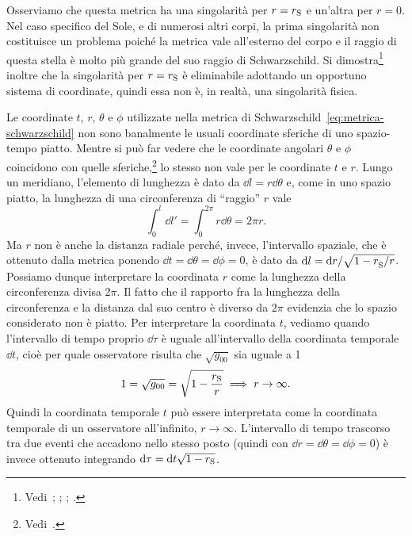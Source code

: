 Osserviamo che questa metrica ha una singolarità per $r = r_{\textup{S}}$ e
un'altra per $r = 0$.  Nel caso specifico del Sole, e di numerosi altri corpi,
la prima singolarità non costituisce un problema poiché la metrica vale
all'esterno del corpo e il raggio di questa stella è molto più grande del suo
raggio di Schwarzschild.  Si
dimostra\footnote{Vedi~\textcite[511]{barone:relativita};
  \textcite[403-404]{landau:campi}; \textcite[374-378]{ohanian:gravitazione};
  \textcite[207-208]{weinberg:gravitation}.}  inoltre che la singolarità per $r
= r_{\textup{S}}$ è eliminabile adottando un opportuno sistema di coordinate,
quindi essa non è, in realtà, una singolarità fisica.

Le coordinate $t$, $r$, $\theta$ e $\phi$ utilizzate nella metrica di
Schwarzschild~\eqref{eq:metrica-schwarzschild} non sono banalmente le usuali
coordinate sferiche di uno spazio-tempo piatto.  Mentre si può far vedere che le
coordinate angolari $\theta$ e $\phi$ coincidono con quelle
sferiche,\footnote{Vedi~\textcite[333]{ohanian:gravitazione}.} lo stesso non
vale per le coordinate $t$ e $r$.  Lungo un meridiano, l'elemento di lunghezza è
dato da $\dd l = r\dd\theta$ e, come in uno spazio piatto, la lunghezza di una
circonferenza di ``raggio'' $r$ vale
\begin{equation}
  \int_{0}^{l} \dd l' = \int_{0}^{2\pi}r\dd\theta = 2\pi r.
\end{equation}
Ma $r$ non è anche la distanza radiale perché, invece, l'intervallo spaziale,
che è ottenuto dalla metrica ponendo $\dd t = \dd\theta = \dd\phi = 0$, è dato
da $\mathop{}\!\mathrm{d} l = \mathop{}\!\mathrm{d} r/\sqrt{1-r_{\textup{S}}^{}/r}$.  Possiamo dunque interpretare
la coordinata $r$ come la lunghezza della circonferenza divisa $2\pi$.  Il fatto
che il rapporto fra la lunghezza della circonferenza e la distanza dal suo
centro è diverso da $2\pi$ evidenzia che lo spazio considerato non è piatto.
Per interpretare la coordinata $t$, vediamo quando l'intervallo di tempo proprio
$\dd\tau$ è uguale all'intervallo della coordinata temporale $\dd t$, cioè per
quale osservatore risulta che $\sqrt{g_{00}}$ sia uguale a 1
\begin{equation}
  1 = \sqrt{g_{00}} = \sqrt{1 - \frac{r_{\textup{S}}}{r}} \implies r \to \infty.
\end{equation}
Quindi la coordinata temporale $t$ può essere interpretata come la coordinata
temporale di un osservatore all'infinito, $r \to \infty$.  L'intervallo di tempo
trascorso tra due eventi che accadono nello stesso posto (quindi con $\dd r =
\dd\theta = \dd\phi = 0$) è invece ottenuto integrando $\mathop{}\!\mathrm{d}\tau = \mathop{}\!\mathrm{d} t
\sqrt{1-r_ {\textup{S}}}$.

